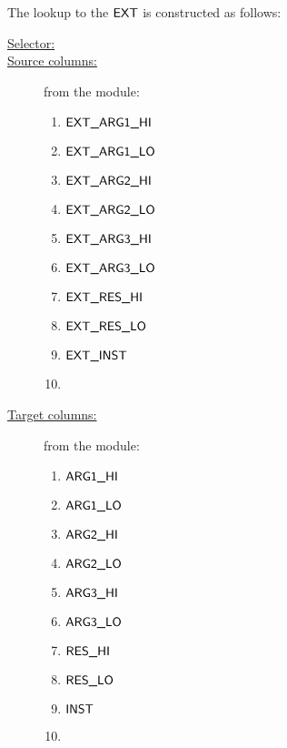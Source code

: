 The lookup to the $\textsf{EXT}$ is constructed as follows:

\begin{description}
    \item[\underline{Selector:}] \extFlag{}
    \item[\underline{Source columns:}] from the \ecDataMod{} module:
          \begin{multicols}{3}
              \begin{enumerate}
                  \item $\textsf{EXT\_ARG1\_HI}$
                  \item $\textsf{EXT\_ARG1\_LO}$
                  \item $\textsf{EXT\_ARG2\_HI}$
                  \item $\textsf{EXT\_ARG2\_LO}$
                  \item $\textsf{EXT\_ARG3\_HI}$
                  \item $\textsf{EXT\_ARG3\_LO}$
                  \item $\textsf{EXT\_RES\_HI}$
                  \item $\textsf{EXT\_RES\_LO}$
                  \item $\textsf{EXT\_INST}$
                  \item[\vspace{\fill}]
              \end{enumerate}
          \end{multicols}
    \item[\underline{Target columns:}] from the \extMod{} module:
          \begin{multicols}{3}
              \begin{enumerate}
                  \item $\textsf{ARG}\textsf{1}\textsf{\_HI}$
                  \item $\textsf{ARG}\textsf{1}\textsf{\_LO}$
                  \item $\textsf{ARG}\textsf{2}\textsf{\_HI}$
                  \item $\textsf{ARG}\textsf{2}\textsf{\_LO}$
                  \item $\textsf{ARG}\textsf{3}\textsf{\_HI}$
                  \item $\textsf{ARG}\textsf{3}\textsf{\_LO}$
                  \item $\textsf{RES}\textsf{\_HI}$
                  \item $\textsf{RES}\textsf{\_LO}$
                  \item $\textsf{INST}$
                  \item[\vspace{\fill}]
              \end{enumerate}
          \end{multicols}
\end{description}

\newpage